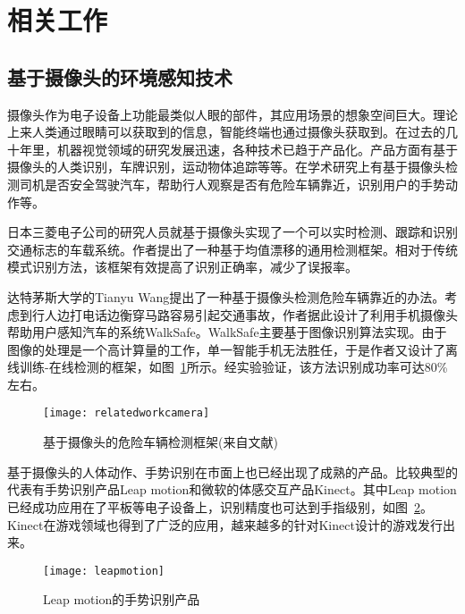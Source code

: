 \section{相关工作}

\subsection{基于摄像头的环境感知技术}


摄像头作为电子设备上功能最类似人眼的部件，其应用场景的想象空间巨大。理论上来人类通过眼睛可以获取到的信息，智能终端也通过摄像头获取到。在过去的几十年里，机器视觉领域的研究发展迅速，各种技术已趋于产品化。产品方面有基于摄像头的人类识别，车牌识别，运动物体追踪等等。在学术研究上有基于摄像头检测司机是否安全驾驶汽车，帮助行人观察是否有危险车辆靠近，识别用户的手势动作等。

日本三菱电子公司的研究人员就基于摄像头实现了一个可以实时检测、跟踪和识别交通标志的车载系统。作者提出了一种基于均值漂移的通用检测框架。相对于传统模式识别方法，该框架有效提高了识别正确率，减少了误报率。 

达特茅斯大学的Tianyu Wang提出了一种基于摄像头检测危险车辆靠近的办法。考虑到行人边打电话边衡穿马路容易引起交通事故，作者据此设计了利用手机摄像头帮助用户感知汽车的系统WalkSafe。WalkSafe主要基于图像识别算法实现。由于图像的处理是一个高计算量的工作，单一智能手机无法胜任，于是作者又设计了离线训练-在线检测的框架，如图~\ref{fig:relatedworkcamera}所示。经实验验证，该方法识别成功率可达80\%左右。
\begin{figure}[htbp] %
  \centering
  \texttt{[image: relatedworkcamera]}
  \caption[基于摄像头的危险车辆检测框架]{基于摄像头的危险车辆检测框架(来自文献)}
  \label{fig:relatedworkcamera}
\end{figure}

基于摄像头的人体动作、手势识别在市面上也已经出现了成熟的产品。比较典型的代表有手势识别产品Leap motion和微软的体感交互产品Kinect。其中Leap motion已经成功应用在了平板等电子设备上，识别精度也可达到手指级别，如图~\ref{fig:leapmotion}。Kinect在游戏领域也得到了广泛的应用，越来越多的针对Kinect设计的游戏发行出来。

\begin{figure}[htbp] %
  \centering
  \texttt{[image: leapmotion]}
  \caption{Leap motion的手势识别产品}
  \label{fig:leapmotion}
\end{figure}


